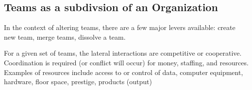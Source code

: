 

\subsection{Teams as a subdivsion of an Organization}

In the context of altering teams, there are a few major levers available: create new team, merge teams, dissolve a team. 

For a given set of teams, the lateral interactions are competitive or cooperative. Coordination is required (or conflict will occur) for money, staffing, and resources. Examples of resources include access to or control of data, computer equipment, hardware, floor space, prestige, products (output)